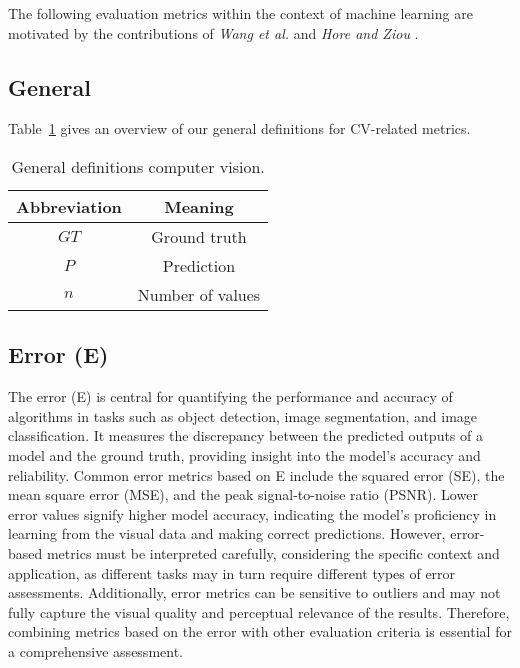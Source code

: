 \documentclass{article}
\begin{document}
The following evaluation metrics within the context of machine learning are motivated by the contributions of \textit{Wang et al.} \cite{wang2003multiscale} and \textit{Hore and Ziou} \cite{hore2010image}.


\subsection{General}

Table~\ref{table:CV_general} gives an overview of our general definitions for CV-related metrics.

\begin{table}[H]
    \centering

    \begin{tabular}{|c|c|}
        \hline
        Abbreviation & Meaning \\
        \hline
        \hline
        $\textit{GT}$ & Ground truth     \\
        $P$           & Prediction       \\
        $n$           & Number of values \\
        \hline
    \end{tabular}

    \caption{General definitions computer vision.}
    \label{table:CV_general}
\end{table}


\subsection{Error (E)}

The error (E) is central for quantifying the performance and accuracy of algorithms in tasks such as object detection, image segmentation, and image classification. It measures the discrepancy between the predicted outputs of a model and the ground truth, providing insight into the model's accuracy and reliability. Common error metrics based on E include the squared error (SE), the mean square error (MSE), and the peak signal-to-noise ratio (PSNR). Lower error values signify higher model accuracy, indicating the model's proficiency in learning from the visual data and making correct predictions. However, error-based metrics must be interpreted carefully, considering the specific context and application, as different tasks may in turn require different types of error assessments. Additionally, error metrics can be sensitive to outliers and may not fully capture the visual quality and perceptual relevance of the results. Therefore, combining metrics based on the error with other evaluation criteria is essential for a comprehensive assessment.
\end{document}

